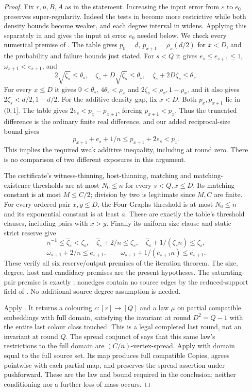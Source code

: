 \begin{proof}
Fix $r,n,B,A$ as in the statement. Increasing the input error from
$\varepsilon$ to $e_0$ preserves super-regularity. Indeed the tests in
 become more restrictive while both density bounds
become weaker, and each degree interval in 
widens. Applying this separately in  and
 gives the input at error $e_0$ needed below.
We check every numerical premise of .
The table gives $p_0=d$, $p_{x+1}=\rho_x(d/2)$ for $x<D$, and the
probability and failure bounds just stated. For $s<Q$ it gives
$e_s\leq e_{s+1}\leq1$, $\omega_{s+1}<e_{s+1}$, and
\[
 2\sqrt{\zeta_s}\leq\theta_s,\quad
 \zeta_s+D\sqrt{\zeta_s}\leq\theta_s,\quad
 \zeta_s+2D\zeta_s\leq\theta_s.
\]
For every $x\leq D$ it gives $0<\theta_s$, $4\theta_s<\rho_x$ and
$2\zeta_s<\rho_x,1-\rho_x$, and it also gives
$2\zeta_s<d/2,1-d/2$.
For the additive density gap, fix $x<D$. Both $p_x,p_{x+1}$ lie in
$(0,1]$. The table gives $2e_s<p_x-p_{x+1}$, forcing
$p_{x+1}<p_x$. Thus the truncated difference is the ordinary finite real
difference, and our added reciprocal-size bound gives
\[
 p_{x+1}+e_s+1/n\leq p_{x+1}+2e_s<p_x.
\]
This implies the required weak additive inequality, including at round zero.
There is no comparison of two different exposures in this argument.

The certificate's witness-thinning, host-thinning, matching and
matching-existence thresholds are at most $N_0\leq n$ for every
$s<Q,x\leq D$. Its matching constant is at most $M\leq C/2$;
division by two is legitimate since $M,C$ are finite. For every ordered
pair $x,y\leq D$, the Four Graphs threshold is at most $N_0\leq n$
and its exponential constant is at least $a$. These are exactly the
table's threshold clauses, including pairs with $x>y$.
Finally its uniform-size clause and static strict reserve give
\[
 n^{-1}\leq\widehat\zeta_s<\zeta_s,\quad
 \widehat\zeta_s+2/n\leq\zeta_s,\quad
 \widehat\zeta_s+1/(\zeta_sn)\leq\zeta_s,
\]
\[
 \omega_{s+1}+2/n\leq e_{s+1},\qquad
 \omega_{s+1}+1/(e_{s+1}n)\leq e_{s+1}.
\]
These verify all six reserve/output premises of the iteration theorem.
The size, degree, host and candidacy premises are the present hypotheses.
The saturating-pair premise is exactly ;
nonedges contain no source edges by the reduced-support field of
. No additional source degree assumption is needed.

Apply . It returns a colouring
$c:[r]\to[Q]$ and a law $\mu$ on partial compatible embeddings with full
domain, satisfying the invariant at round $D^2=Q-1$ with the entire last
colour class touched. This is a legal completed last round, not an
invariant at round $Q$. The spread conjunct of
 says that this same law's restrictions to
the full domain are $(C/n)$-vertex-spread. Apply
 with domain equal to the full source
set. Its map produces full compatible Copies, agrees pointwise with each
partial map, and preserves the spread assertion under pushforward. These
are the law and bound required in the conclusion; neither conditioning nor
a further loss of mass occurs.
\end{proof}
